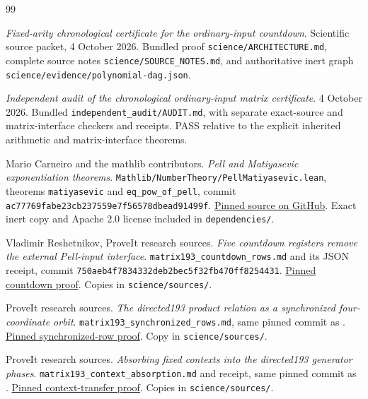 \documentclass[11pt,letterpaper]{article}
\theoremstyle{definition}
\theoremstyle{remark}
\begin{document}
\begin{thebibliography}{99}
\raggedright
{}
\emph{Fixed-arity chronological certificate for the ordinary-input countdown}. Scientific source packet, 4 October 2026. Bundled proof \texttt{science/ARCHITECTURE.md}, complete source notes \texttt{science/SOURCE\_NOTES.md}, and authoritative inert graph \texttt{science/evidence/polynomial-dag.json}.

\emph{Independent audit of the chronological ordinary-input matrix certificate}. 4 October 2026. Bundled \texttt{independent\_audit/AUDIT.md}, with separate exact-source and matrix-interface checkers and receipts. PASS relative to the explicit inherited arithmetic and matrix-interface theorems.

Mario Carneiro and the mathlib contributors. \emph{Pell and Matiyasevic exponentiation theorems}. \texttt{Mathlib/NumberTheory/PellMatiyasevic.lean}, theorems \texttt{matiyasevic} and \texttt{eq\_pow\_of\_pell}, commit \texttt{ac77769fabe23cb237559e7f56578dbead91499f}. \href{https://github.com/leanprover-community/mathlib4/blob/ac77769fabe23cb237559e7f56578dbead91499f/Mathlib/NumberTheory/PellMatiyasevic.lean}{Pinned source on GitHub}. Exact inert copy and Apache 2.0 license included in \texttt{dependencies/}.

Vladimir Reshetnikov, ProveIt research sources. \emph{Five countdown registers remove the external Pell-input interface}. \texttt{matrix193\_countdown\_rows.md} and its JSON receipt, commit \texttt{750aeb4f7834332deb2bec5f32fb470ff8254431}. \href{https://github.com/VladimirReshetnikov/ProveIt/blob/750aeb4f7834332deb2bec5f32fb470ff8254431/Computability/HilbertTenthProblem/Papers/research-wip/native-stream-queue/matrix193_countdown_rows.md}{Pinned countdown proof}. Copies in \texttt{science/sources/}.

ProveIt research sources. \emph{The directed193 product relation as a synchronized four-coordinate orbit}. \texttt{matrix193\_synchronized\_rows.md}, same pinned commit as \cite{cm-countdown}. \href{https://github.com/VladimirReshetnikov/ProveIt/blob/750aeb4f7834332deb2bec5f32fb470ff8254431/Computability/HilbertTenthProblem/Papers/research-wip/native-stream-queue/matrix193_synchronized_rows.md}{Pinned synchronized-row proof}. Copy in \texttt{science/sources/}.

ProveIt research sources. \emph{Absorbing fixed contexts into the directed193 generator phases}. \texttt{matrix193\_context\_absorption.md} and receipt, same pinned commit as \cite{cm-countdown}. \href{https://github.com/VladimirReshetnikov/ProveIt/blob/750aeb4f7834332deb2bec5f32fb470ff8254431/Computability/HilbertTenthProblem/Papers/research-wip/native-stream-queue/matrix193_context_absorption.md}{Pinned context-transfer proof}. Copies in \texttt{science/sources/}.


\end{thebibliography}
\end{document}
